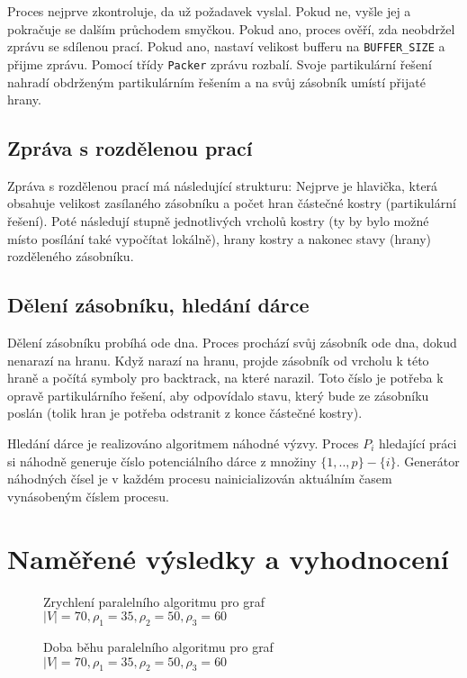 \documentclass[12pt]{article}
\begin{document}
Proces nejprve zkontroluje, da už požadavek vyslal. Pokud ne, vyšle jej a pokračuje se dalším průchodem smyčkou. Pokud ano, proces ověří, zda neobdržel zprávu se sdílenou prací. Pokud ano, nastaví velikost bufferu na \texttt{BUFFER\_SIZE} a přijme zprávu. Pomocí třídy \texttt{Packer} zprávu rozbalí. Svoje partikulární řešení nahradí obdrženým partikulárním řešením a na svůj zásobník umístí přijaté hrany.

\subsection{Zpráva s rozdělenou prací}
Zpráva s rozdělenou prací má následující strukturu: Nejprve je hlavička, která obsahuje velikost zasílaného zásobníku a počet hran částečné kostry (partikulární řešení). Poté následují stupně jednotlivých vrcholů kostry (ty by bylo možné místo posílání také vypočítat lokálně), hrany kostry a nakonec stavy (hrany) rozděleného zásobníku.

\subsection{Dělení zásobníku, hledání dárce}
Dělení zásobníku probíhá ode dna. Proces prochází svůj zásobník ode dna, dokud nenarazí na hranu. Když narazí na hranu, projde zásobník od vrcholu k této hraně a počítá symboly pro backtrack, na které narazil. Toto číslo je potřeba k opravě partikulárního řešení, aby odpovídalo stavu, který bude ze zásobníku poslán (tolik hran je potřeba odstranit z konce částečné kostry).

Hledání dárce je realizováno algoritmem náhodné výzvy. Proces $P_{i}$ hledající práci si náhodně generuje číslo potenciálního dárce z množiny $\{1, .. ,p\}-\{i\}$. Generátor náhodných čísel je v každém procesu nainicializován aktuálním časem vynásobeným číslem procesu.

\section{Naměřené výsledky a vyhodnocení}

\begin{figure}[ht]
\epsfysize=10cm \centerline{} \caption{Zrychlení paralelního algoritmu pro graf $\vert V \vert = 70, \rho_{1} = 35, \rho_{2} = 50, \rho_{3} = 60$} \label{seq}
\end{figure}

\begin{figure}[ht]
\epsfysize=10cm \centerline{} \caption{Doba běhu paralelního algoritmu pro graf $\vert V \vert = 70, \rho_{1} = 35, \rho_{2} = 50, \rho_{3} = 60$} \label{seq}
\end{figure}
\end{document}
